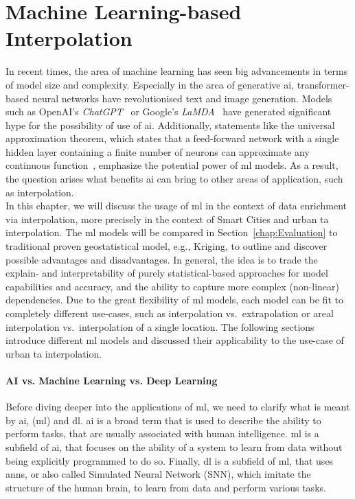\chapter{Machine Learning-based Interpolation}
\label{chap:Machine Learning based Interpolation}

In recent times, the area of machine learning has seen big advancements in terms of model size and complexity. Especially in the area of generative \gls{ai}, transformer-based neural networks have revolutionised text and image generation. Models such as OpenAI's \textit{ChatGPT}~\cite{openai2023gpt4} or Google's \textit{LaMDA}~\cite{thoppilan2022lamda} have generated significant hype for the possibility of use of \gls{ai}\@. Additionally, statements like the universal approximation theorem, which states that a feed-forward network with a single hidden layer containing a finite number of neurons can approximate any continuous function~\cite{hornik1989multilayer}, emphasize the potential power of \gls{ml} models. As a result, the question arises what benefits \gls{ai} can bring to other areas of application, such as interpolation.\\
In this chapter, we will discuss the usage of \gls{ml} in the context of data enrichment via interpolation, more precisely in the context of Smart Cities and urban \gls{ta} interpolation. The \gls{ml} models will be compared in Section~\ref{chap:Evaluation} to traditional proven geostatistical model, e.g., Kriging, to outline and discover possible advantages and disadvantages. In general, the idea is to trade the explain- and interpretability of purely statistical-based approaches for model capabilities and accuracy, and the ability to capture more complex (non-linear) dependencies.
Due to the great flexibility of \gls{ml} models, each model can be fit to completely different use-cases, such as interpolation vs.\ extrapolation or areal interpolation vs.\ interpolation of a single location. The following sections introduce different \gls{ml} models and discussed their applicability to the use-case of urban \gls{ta} interpolation.

\subsubsection{AI vs. Machine Learning vs. Deep Learning}

Before diving deeper into the applications of \gls{ml}, we need to clarify what is meant by \gls{ai}, (\gls{ml}) and \gls{dl}. \gls{ai} is a broad term that is used to describe the ability to perform tasks, that are usually associated with human intelligence. \gls{ml} is a subfield of \gls{ai}, that focuses on the ability of a system to learn from data without being explicitly programmed to do so. Finally, \gls{dl} is a subfield of \gls{ml}, that uses \gls{ann}s, or also called Simulated Neural Network (SNN), which imitate the structure of the human brain, to learn from data and perform various tasks.

